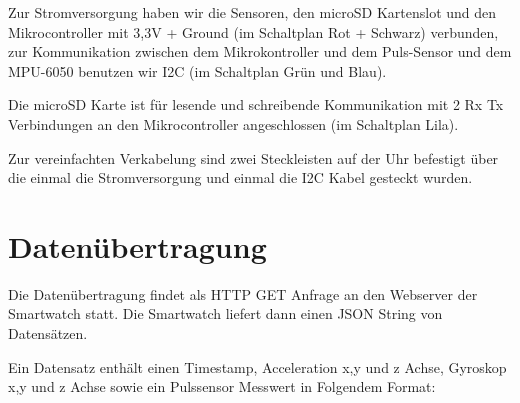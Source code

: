 \documentclass[a4paper, 11pt]{article}
\begin{document}
\noindent Zur Stromversorgung haben wir die Sensoren, den microSD Kartenslot und den Mikrocontroller mit 3,3V + Ground (im Schaltplan Rot + Schwarz) verbunden, zur Kommunikation zwischen dem Mikrokontroller und dem Puls-Sensor und dem MPU-6050 benutzen wir I2C (im Schaltplan Grün und Blau).

\noindent Die microSD Karte ist für lesende und schreibende Kommunikation mit 2 Rx Tx Verbindungen an den Mikrocontroller angeschlossen (im Schaltplan Lila).

\noindent Zur vereinfachten Verkabelung sind zwei Steckleisten auf der Uhr befestigt über die einmal die Stromversorgung und einmal die I2C Kabel gesteckt wurden.


\clearpage

\section{Datenübertragung}
Die Datenübertragung findet als HTTP GET Anfrage an den Webserver der Smartwatch statt. Die Smartwatch liefert dann einen JSON String von Datensätzen.

\noindent
Ein Datensatz enthält einen Timestamp, Acceleration x,y und z Achse, Gyroskop x,y und z Achse sowie ein Pulssensor Messwert in Folgendem Format:

\clearpage
\end{document}
